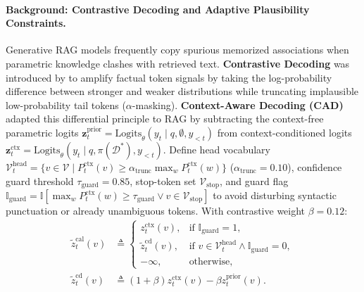 \documentclass[11pt]{article}
\begin{document}
\paragraph{Background: Contrastive Decoding and Adaptive Plausibility Constraints.}
Generative RAG models frequently copy spurious memorized associations when parametric knowledge clashes with retrieved text. \textbf{Contrastive Decoding} was introduced by \citet{li2023contrastive} to amplify factual token signals by taking the log-probability difference between stronger and weaker distributions while truncating implausible low-probability tail tokens ($\alpha$-masking). \textbf{Context-Aware Decoding (CAD)} \cite{shi2024cad} adapted this differential principle to RAG by subtracting the context-free parametric logits $\mathbf{z}_t^{\text{prior}} = \text{Logits}_{\theta}(y_t \mid q, \emptyset, y_{<t})$ from context-conditioned logits $\mathbf{z}_t^{\text{ctx}} = \text{Logits}_{\theta}(y_t \mid q, \pi(\mathcal{D}^*), y_{<t})$. Define head vocabulary $\mathcal{V}_t^{\text{head}} = \{v \in \mathcal{V} \mid P_t^{\text{ctx}}(v) \ge \alpha_{\text{trunc}} \max_w P_t^{\text{ctx}}(w)\}$ ($\alpha_{\text{trunc}} = 0.10$), confidence guard threshold $\tau_{\text{guard}} = 0.85$, stop-token set $\mathcal{V}_{\text{stop}}$, and guard flag $\mathbb{I}_{\text{guard}} = \mathbb{I}[\max_w P_t^{\text{ctx}}(w) \ge \tau_{\text{guard}} \lor v \in \mathcal{V}_{\text{stop}}]$ to avoid disturbing syntactic punctuation or already unambiguous tokens. With contrastive weight $\beta = 0.12$:
\begin{align}
\tilde{z}_t^{\text{cal}}(v) &\triangleq \begin{cases}
z_t^{\text{ctx}}(v), & \text{if } \mathbb{I}_{\text{guard}} = 1, \\
\tilde{z}_t^{\text{cd}}(v), & \text{if } v \in \mathcal{V}_t^{\text{head}} \land \mathbb{I}_{\text{guard}} = 0, \\
-\infty, & \text{otherwise},
\end{cases} \label{eq:m3_contrastive} \\
\tilde{z}_t^{\text{cd}}(v) &\triangleq (1 + \beta) z_t^{\text{ctx}}(v) - \beta z_t^{\text{prior}}(v). \nonumber
\end{align}
\end{document}
